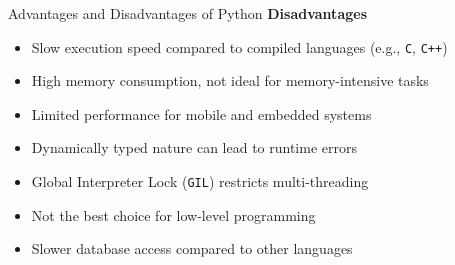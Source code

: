 \documentclass[10pt]{beamer}
\let\olditem\item
\renewcommand\item{\olditem\justifying}
\begin{document}
	\begin{frame}{Advantages and Disadvantages of Python}
		\textbf{Disadvantages}
		\hfill {} \\[0.1cm]
		\begin{itemize}
			\item Slow execution speed compared to compiled languages (e.g., \texttt{C}, \texttt{C++})
			\item High memory consumption, not ideal for memory-intensive tasks
			\item Limited performance for mobile and embedded systems
			\item Dynamically typed nature can lead to runtime errors
			\item Global Interpreter Lock (\texttt{GIL}) restricts multi-threading
			\item Not the best choice for low-level programming
			\item Slower database access compared to other languages
		\end{itemize}
	\end{frame}
	
\end{document}
